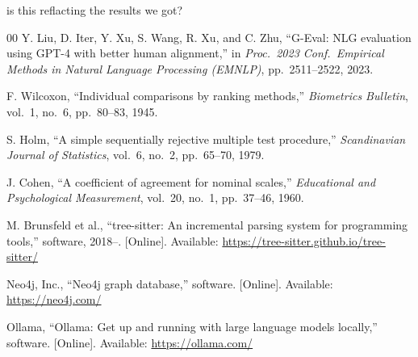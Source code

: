 is this reflacting the results we got?\documentclass[conference]{IEEEtran}
\begin{document}
\begin{thebibliography}{00}
Y. Liu, D. Iter, Y. Xu, S. Wang, R. Xu, and C. Zhu,
``G-Eval: NLG evaluation using GPT-4 with better human alignment,''
in \emph{Proc.\ 2023 Conf.\ Empirical Methods in Natural Language Processing (EMNLP)},
pp.\ 2511--2522, 2023.

F. Wilcoxon,
``Individual comparisons by ranking methods,''
\emph{Biometrics Bulletin}, vol.\ 1, no.\ 6, pp.\ 80--83, 1945.

S. Holm,
``A simple sequentially rejective multiple test procedure,''
\emph{Scandinavian Journal of Statistics}, vol.\ 6, no.\ 2, pp.\ 65--70, 1979.

J. Cohen,
``A coefficient of agreement for nominal scales,''
\emph{Educational and Psychological Measurement}, vol.\ 20, no.\ 1, pp.\ 37--46, 1960.

M. Brunsfeld et al.,
``tree-sitter: An incremental parsing system for programming tools,''
software, 2018--. [Online]. Available: \url{https://tree-sitter.github.io/tree-sitter/}

Neo4j, Inc.,
``Neo4j graph database,''
software. [Online]. Available: \url{https://neo4j.com/}

Ollama,
``Ollama: Get up and running with large language models locally,''
software. [Online]. Available: \url{https://ollama.com/}


\end{thebibliography}
\end{document}
